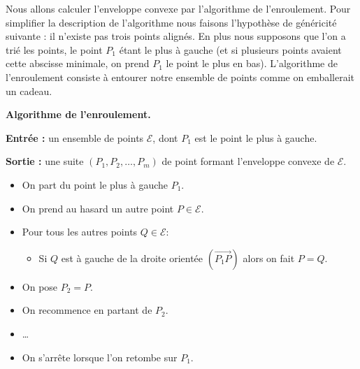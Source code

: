 \documentclass[11pt,class=report,crop=false]{standalone}
\begin{document}

Nous allons calculer l'enveloppe convexe par l'algorithme de l'enroulement.
Pour simplifier la description de l'algorithme nous faisons l'hypothèse de généricité  suivante : il n'existe pas trois points alignés.
En plus nous supposons que l'on a trié les points, le point $P_1$ étant le plus à gauche (et si plusieurs points avaient cette abscisse minimale, on prend $P_1$ le point le plus en bas).
L'algorithme de l'enroulement consiste à entourer notre ensemble de points comme on emballerait un cadeau.




\begin{algorithme}
\textbf{Algorithme de l'enroulement.}

\textbf{Entrée :} un ensemble de points $\mathcal{E}$, dont $P_1$ est le point le plus à gauche.

\textbf{Sortie :} une suite $(P_1,P_2,\ldots,P_m)$ de point formant l'enveloppe convexe de $\mathcal{E}$.

\begin{itemize}
	\item On part du point le plus à gauche $P_1$.
	\item On prend au hasard un autre point $P \in \mathcal{E}$.
	\item Pour tous les autres points $Q \in \mathcal{E}$:
	  \begin{itemize}
	  	\item Si $Q$ est à gauche de la droite orientée $(\vec{P_1P})$ alors 
	  	on fait $P = Q$.
	  \end{itemize}	
    \item On pose $P_2 = P$.
    \item On recommence en partant de $P_2$.
    \item \ldots
    \item On s'arrête lorsque l'on retombe sur $P_1$.
\end{itemize}	  	
\end{algorithme}	

\bigskip
\end{document}
